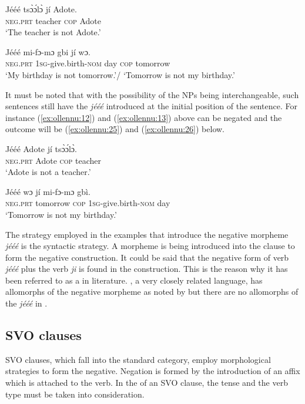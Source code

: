\documentclass[output=paper
,newtxmath
,modfonts
,nonflat]{langsci/langscibook}
\begin{document}
\ea \label{ex:ollennu:23}
\gll J\'e\'e\'e ts\`ɔ\'ɔl\`ɔ j\'i Adote.\\
\textsc{neg}.\textsc{prt} teacher \textsc{cop} Adote\\
\glt `The teacher is not Adote.'
\z

\ea \label{ex:ollennu:24}
\gll J\'e\'e\'e mi-fɔ-mɔ gbi j\'i wɔ.\\
\textsc{neg}.\textsc{prt} 1\textsc{sg}-give.birth-\textsc{nom} day \textsc{cop} tomorrow\\
\glt 	`My birthday is not tomorrow.'/ `Tomorrow is not my birthday.'
\z

It must be noted that with the possibility of the NPs being interchangeable, such sentences still have the  \textit{j\'e\'e\'e} introduced at the initial position of the sentence. For instance (\ref{ex:ollennu:12}) and (\ref{ex:ollennu:13}) above can be negated and the outcome will be (\ref{ex:ollennu:25}) and (\ref{ex:ollennu:26}) below.

\ea \label{ex:ollennu:25}
 \gll J\'e\'e\'e Adote j\'i ts\`ɔ\'ɔl\`ɔ. \\
\textsc{neg}.\textsc{prt} Adote \textsc{cop} teacher\\
\glt `Adote is not a teacher.'
\z

\ea \label{ex:ollennu:26}
\gll J\'e\'e\'e wɔ j\'i mi-fɔ-mɔ gb\`i.\\
\textsc{neg}.\textsc{prt} tomorrow \textsc{cop} 1\textsc{sg}-give.birth-\textsc{nom} day\\
\glt `Tomorrow is not my birthday.'
\z


The strategy employed in the examples that introduce the negative morpheme \textit{j\'e\'e\'e} is the syntactic strategy. A morpheme is being introduced into the clause to form the negative construction. It could be said that the negative form of  verb \textit{j\'e\'e\'e} plus the  verb \textit{ji} is found in the construction. This is the reason why it has been referred to as a  in  literature. , a very closely related language, has allomorphs of the negative morpheme as noted by \citet{caesar2012} but there are no allomorphs of the \textit{j\'e\'e\'e}  in .

\subsection{\label{sec:ollennu:2.3} SVO clauses}

SVO clauses, which fall into the standard  category, employ morphological strategies to form the negative. Negation is formed by the introduction of an affix which is attached to the verb. In the  of an SVO clause, the tense and the verb type must be taken into consideration.
\end{document}
